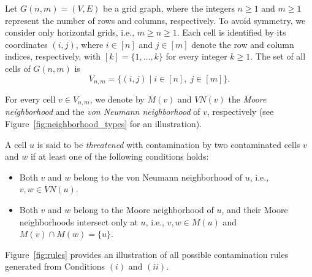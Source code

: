 \documentclass[letterpaper,12pt]{article}
\begin{document}
Let $G(n,m)=(V,E)$ be a grid graph, where the integers $n\geq 1$ and $m\geq 1$ represent the number of rows and columns, respectively. To avoid symmetry, we consider only horizontal grids, i.e.,  $m\geq n\geq 1$. 
Each cell is identified by its coordinates $(i,j)$, where \(i \in [n]\) and \(j \in [m]\) denote the row and column indices, respectively, with \([k]=\{1,\ldots,k\}\) for every integer \(k \ge 1\). The set of all cells of $G(n,m)$ is 
$$V_{n,m}=\{(i,j)\mid i\in[n],\; j\in[m] \}.$$



For every cell \( v \in V_{n,m} \), we denote by \( M(v) \) and \( VN(v) \) the \emph{Moore neighborhood} and the \emph{von Neumann neighborhood} of \( v \), respectively (see Figure~\ref{fig:neighborhood_types} for an illustration).

A cell \( u \) is said to be \emph{threatened} with contamination by two contaminated cells \( v \) and \( w \) if at least one of the following conditions holds:
\begin{itemize}
    \item[$(i)$] Both \( v \) and \( w \) belong to the von Neumann neighborhood of \( u \), i.e., \( v, w \in VN(u) \).
    \item[$(ii)$] Both \( v \) and \( w \) belong to the Moore neighborhood of \( u \), and their Moore neighborhoods intersect only at \( u \), i.e., $v, w \in M(u)$ and $M(v) \cap M(w) = \{u\}$.
\end{itemize}

Figure~\ref{fig:rules} provides an illustration of all possible contamination rules generated from Conditions $(i)$ and $(ii)$.
\end{document}
